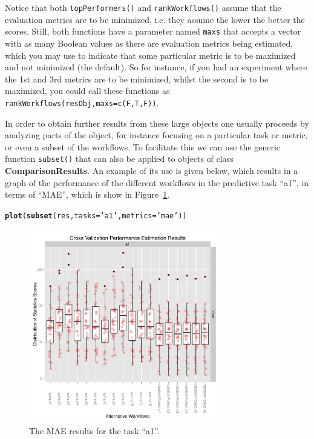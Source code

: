 \documentclass[10pt,a4paper]{article}\usepackage[]{graphicx}\usepackage[]{color}
\makeatletter
\newcommand{\hlstr}[1]{\textcolor[rgb]{0.192,0.494,0.8}{#1}}%
\newcommand{\hlstd}[1]{\textcolor[rgb]{0.345,0.345,0.345}{#1}}%
\newcommand{\hlkwc}[1]{\textcolor[rgb]{0.333,0.667,0.333}{#1}}%
\newcommand{\hlkwd}[1]{\textcolor[rgb]{0.737,0.353,0.396}{\textbf{#1}}}%
\newenvironment{kframe}{%
 \def\at@end@of@kframe{}%
 \ifinner\ifhmode%
  \def\at@end@of@kframe{\end{minipage}}%
  \begin{minipage}{\columnwidth}%
 \fi\fi%
 \def\FrameCommand##1{\hskip\@totalleftmargin \hskip-\fboxsep
 \colorbox{shadecolor}{##1}\hskip-\fboxsep
     \hskip-\linewidth \hskip-\@totalleftmargin \hskip\columnwidth}%
 \MakeFramed {\advance\hsize-\width
   \@totalleftmargin\z@ \linewidth\hsize
   \@setminipage}}%
 {\par\unskip\endMakeFramed%
 \at@end@of@kframe}
\newenvironment{knitrout}{}{} %
\makeatother
\begin{document}
Notice that both \texttt{topPerformers()} and \texttt{rankWorkflows()}
assume that the evaluation metrics are to be minimized, i.e. they
assume the lower the better the scores. Still, both functions have a
parameter named \texttt{maxs} that accepts a vector with as many
Boolean values as there are evaluation metrics being estimated, which
you may use to indicate that some particular metric is to be maximized
and not minimized (the default). So for instance, if you had an
experiment where the 1st and 3rd metrics are to be minimized, whilst
the second is to be maximized, you could call these functions as
\texttt{rankWorkflows(resObj,maxs=c(F,T,F))}.

In order to obtain further results from these large objects one
usually proceeds by analyzing parts of the object, for instance
focusing on a particular task or metric, or even a subset of the
workflows. To facilitate this we can use the generic function
\texttt{subset()} that can also be applied to objects of class
\textbf{ComparisonResults}. An example of its use is given below, which results
in a graph of the performance of the different workflows in the
predictive task ``a1'', in terms of ``MAE'', which is show in
Figure~\ref{fig:maeA1}.



\begin{knitrout}\footnotesize
{}\color{fgcolor}\begin{kframe}
\begin{alltt}
\hlkwd{plot}\hlstd{(}\hlkwd{subset}\hlstd{(res,} \hlkwc{tasks}\hlstd{=}\hlstr{'a1'}\hlstd{,} \hlkwc{metrics}\hlstd{=}\hlstr{'mae'}\hlstd{))}
\end{alltt}
\end{kframe}\begin{figure}[]


{\centering \includegraphics[width=0.75\textwidth]{figures/perfEst-maeA1} 

}

\caption[The MAE results for the task ``a1'']{The MAE results for the task ``a1''.\label{fig:maeA1}}
\end{figure}


\end{knitrout}
 
\end{document}
